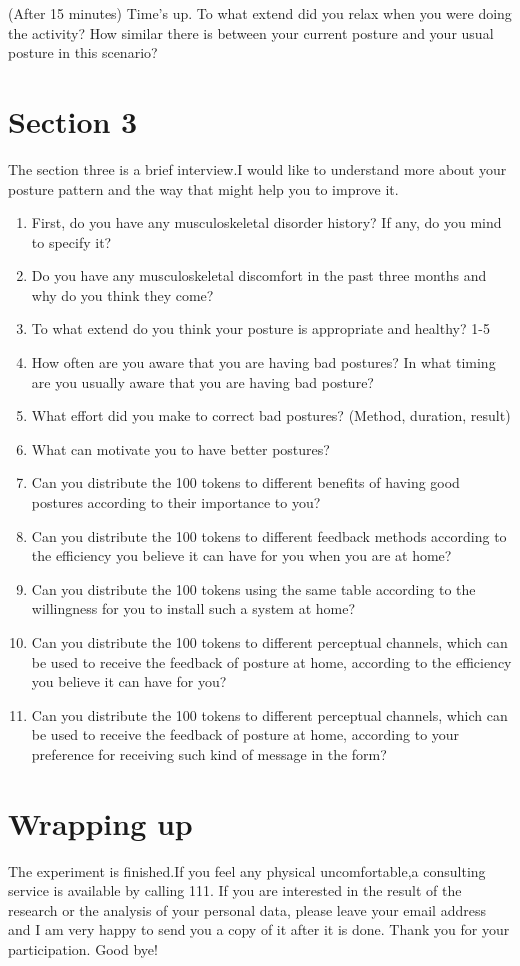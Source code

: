 (After 15 minutes) Time's up. To what extend did you relax when you were doing the activity? How similar there is between your current posture and your usual posture in this scenario? 

\section{Section 3}
The section three is a brief interview.I would like to understand more about your posture pattern and the way that might help you to improve it.\\

\begin{enumerate}
  \item First, do you have any musculoskeletal disorder history? If any, do you mind to specify it?
  \item Do you have any musculoskeletal discomfort in the past three months and why do you think they come?
  \item To what extend do you think your posture is appropriate and healthy? 1-5
  \item How often are you aware that you are having bad postures? In what timing are you usually aware that you are having bad posture?
  \item What effort did you make to correct bad postures? (Method, duration, result)
  \item What can motivate you to have better postures?
  \item Can you distribute the 100 tokens to different benefits of having good postures according to their importance to you?
  \item Can you distribute the 100 tokens to different feedback methods according to the efficiency you believe it can have for you when you are at home?
  \item Can you distribute the 100 tokens using the same table according to the willingness for you to install such a system at home?
  \item Can you distribute the 100 tokens to different perceptual channels, which can be used to receive the feedback of posture at home, according to the efficiency you believe it can have for you?
  \item Can you distribute the 100 tokens to different perceptual channels, which can be used to receive the feedback of posture at home, according to your preference for receiving such kind of message in the form?
\end{enumerate}

\section{Wrapping up}
The experiment is finished.If you feel any physical uncomfortable,a consulting service is available by calling 111. If you are interested in the result of the research or the analysis of your personal data, please leave your email address and I am very happy to send you a copy of it after it is done. Thank you for your participation. Good bye!
